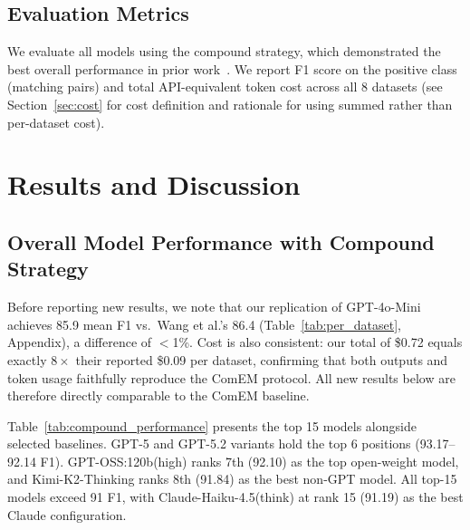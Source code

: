 \documentclass[runningheads]{llncs}
\begin{document}
\subsection{Evaluation Metrics}

We evaluate all models using the compound strategy, which demonstrated the best overall performance in prior work~\cite{wang2025match}. We report F1 score on the positive class (matching pairs) and total API-equivalent token cost across all 8 datasets (see Section~\ref{sec:cost} for cost definition and rationale for using summed rather than per-dataset cost).

\section{Results and Discussion}

\subsection{Overall Model Performance with Compound Strategy}

Before reporting new results, we note that our replication of GPT-4o-Mini achieves 85.9 mean F1 vs.\ Wang et al.'s 86.4 (Table~\ref{tab:per_dataset}, Appendix), a difference of $<$1\%. Cost is also consistent: our total of \$0.72 equals exactly $8\times$ their reported \$0.09 per dataset, confirming that both outputs and token usage faithfully reproduce the ComEM protocol. All new results below are therefore directly comparable to the ComEM baseline.

Table~\ref{tab:compound_performance} presents the top 15 models alongside selected baselines. GPT-5 and GPT-5.2 variants hold the top 6 positions (93.17--92.14 F1). GPT-OSS:120b(high) ranks 7th (92.10) as the top open-weight model, and Kimi-K2-Thinking ranks 8th (91.84) as the best non-GPT model. All top-15 models exceed 91 F1, with Claude-Haiku-4.5(think) at rank 15 (91.19) as the best Claude configuration.
\end{document}
